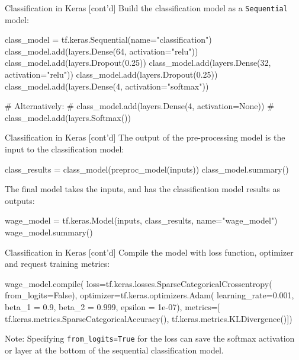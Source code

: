 \documentclass[ignorenonframetext,xcolor=x11names]{beamer}
\begin{document}
\begin{frame}[label=withcode,fragile]{Classification in Keras \small [cont'd]}
Build the classification model as a \texttt{Sequential} model:
\begin{pythoncode}
class_model = tf.keras.Sequential(name="classification")
class_model.add(layers.Dense(64, activation="relu"))
class_model.add(layers.Dropout(0.25))
class_model.add(layers.Dense(32, activation="relu"))
class_model.add(layers.Dropout(0.25))
class_model.add(layers.Dense(4, activation="softmax"))

# Alternatively:
# class_model.add(layers.Dense(4, activation=None))
# class_model.add(layers.Softmax())
\end{pythoncode}
\end{frame}

\begin{frame}[label=withcode,fragile]{Classification in Keras \small [cont'd]}
The output of the pre-processing model is the input to the classification model:
\begin{pythoncode}
class_results = class_model(preproc_model(inputs))
class_model.summary()
\end{pythoncode}
The final model takes the inputs, and has the classification model results as outputs:
\begin{pythoncode}
wage_model = tf.keras.Model(inputs, class_results,
                            name="wage_model")
wage_model.summary()
\end{pythoncode}
\end{frame}

\begin{frame}[label=withcode,fragile]{Classification in Keras \small [cont'd]}
Compile the model with loss function, optimizer and request training metrics:
\begin{pythoncode}
wage_model.compile(
    loss=tf.keras.losses.SparseCategoricalCrossentropy(
       from_logits=False),
    optimizer=tf.keras.optimizers.Adam(
        learning_rate=0.001,
        beta_1 = 0.9,
        beta_2 = 0.999,
        epsilon = 1e-07),
    metrics=[
        tf.keras.metrics.SparseCategoricalAccuracy(), 
        tf.keras.metrics.KLDivergence()])
\end{pythoncode}
Note: Specifying \texttt{from\_logits=True} for the loss can save the softmax activation or layer at the bottom of the sequential classification model.
\end{frame}
\end{document}
